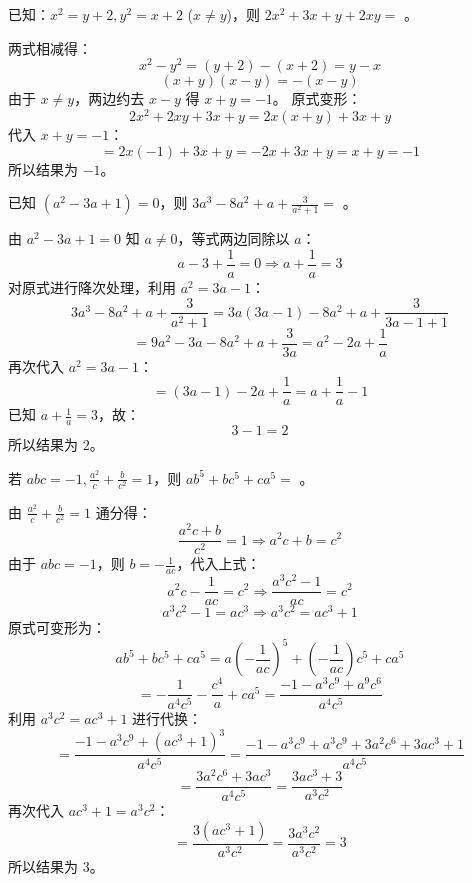 \begin{questions}
    \question 已知：$x^2 = y + 2, y^2 = x + 2$ ($x \ne y$)，则 $2x^2 + 3x + y + 2xy =$ \underline{\hspace{1cm}}。

\begin{solution}
两式相减得：
\[
x^2 - y^2 = (y + 2) - (x + 2) = y - x
\]
\[
(x + y)(x - y) = -(x - y)
\]
由于 $x \ne y$，两边约去 $x - y$ 得 $x + y = -1$。
原式变形：
\[
2x^2 + 2xy + 3x + y = 2x(x + y) + 3x + y
\]
代入 $x + y = -1$：
\[
= 2x(-1) + 3x + y = -2x + 3x + y = x + y = -1
\]
所以结果为 $-1$。
\end{solution}

    \question 已知 $(a^2 - 3a + 1) = 0$，则 $3a^3 - 8a^2 + a + \frac{3}{a^2 + 1} =$ \underline{\hspace{1cm}}。

\begin{solution}
由 $a^2 - 3a + 1 = 0$ 知 $a \ne 0$，等式两边同除以 $a$：
\[
a - 3 + \frac{1}{a} = 0 \Rightarrow a + \frac{1}{a} = 3
\]
对原式进行降次处理，利用 $a^2 = 3a - 1$：
\[
3a^3 - 8a^2 + a + \frac{3}{a^2 + 1} = 3a(3a - 1) - 8a^2 + a + \frac{3}{3a - 1 + 1}
\]
\[
= 9a^2 - 3a - 8a^2 + a + \frac{3}{3a} = a^2 - 2a + \frac{1}{a}
\]
再次代入 $a^2 = 3a - 1$：
\[
= (3a - 1) - 2a + \frac{1}{a} = a + \frac{1}{a} - 1
\]
已知 $a + \frac{1}{a} = 3$，故：
\[
3 - 1 = 2
\]
所以结果为 $2$。
\end{solution}

    \question 若 $abc = -1, \frac{a^2}{c} + \frac{b}{c^2} = 1$，则 $ab^5 + bc^5 + ca^5 =$ \underline{\hspace{1cm}}。

\begin{solution}
由 $\frac{a^2}{c} + \frac{b}{c^2} = 1$ 通分得：
\[
\frac{a^2c + b}{c^2} = 1 \Rightarrow a^2c + b = c^2
\]
由于 $abc = -1$，则 $b = -\frac{1}{ac}$，代入上式：
\[
a^2c - \frac{1}{ac} = c^2 \Rightarrow \frac{a^3c^2 - 1}{ac} = c^2
\]
\[
a^3c^2 - 1 = ac^3 \Rightarrow a^3c^2 = ac^3 + 1
\]
原式可变形为：
\[
ab^5 + bc^5 + ca^5 = a\left(-\frac{1}{ac}\right)^5 + \left(-\frac{1}{ac}\right)c^5 + ca^5
\]
\[
= -\frac{1}{a^4c^5} - \frac{c^4}{a} + ca^5 = \frac{-1 - a^3c^9 + a^9c^6}{a^4c^5}
\]
利用 $a^3c^2 = ac^3 + 1$ 进行代换：
\[
= \frac{-1 - a^3c^9 + (ac^3 + 1)^3}{a^4c^5} = \frac{-1 - a^3c^9 + a^3c^9 + 3a^2c^6 + 3ac^3 + 1}{a^4c^5}
\]
\[
= \frac{3a^2c^6 + 3ac^3}{a^4c^5} = \frac{3ac^3 + 3}{a^3c^2}
\]
再次代入 $ac^3 + 1 = a^3c^2$：
\[
= \frac{3(ac^3 + 1)}{a^3c^2} = \frac{3a^3c^2}{a^3c^2} = 3
\]
所以结果为 $3$。
\end{solution}


\end{questions}
